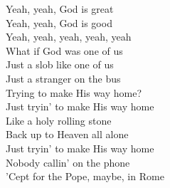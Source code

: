 Yeah, yeah, God is great \\
Yeah, yeah, God is good \\
Yeah, yeah, yeah, yeah, yeah \\[1em]
What if God was one of us \\
Just a slob like one of us \\
Just a stranger on the bus \\
Trying to make His way home? \\[1em]
Just tryin' to make His way home \\
Like a holy rolling stone \\
Back up to Heaven all alone \\
Just tryin' to make His way home \\
Nobody callin' on the phone \\
'Cept for the Pope, maybe, in Rome